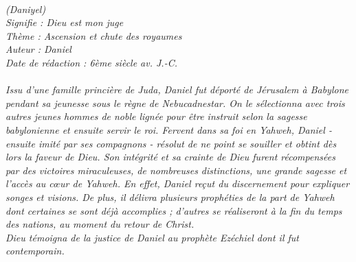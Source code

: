 \BFont
\noindent\hrulefill
{\footnotesize
\textit{
\bigskip
{\centering{}
\\(Daniyel)
\\Signifie : Dieu est mon juge
\\Thème : Ascension et chute des royaumes
\\Auteur : Daniel
\\Date de rédaction : 6ème siècle av. J.-C.\\}
}
\textit{
\\Issu d’une famille princière de Juda, Daniel fut déporté de Jérusalem à Babylone pendant sa jeunesse sous le règne de Nebucadnestar. On le sélectionna avec trois autres jeunes hommes de noble lignée pour être instruit selon la sagesse babylonienne et ensuite servir le roi. Fervent dans sa foi en Yahweh, Daniel - ensuite imité par ses compagnons - résolut de ne point se souiller et obtint dès lors la faveur de Dieu. Son intégrité et sa crainte de Dieu furent récompensées par des victoires miraculeuses, de nombreuses distinctions, une grande sagesse et l’accès au cœur de Yahweh. En effet, Daniel reçut du discernement pour expliquer songes et visions. De plus, il délivra plusieurs prophéties de la part de Yahweh dont certaines se sont déjà accomplies ; d’autres se réaliseront à la fin du temps des nations, au moment du retour de Christ.
\\Dieu témoigna de la justice de Daniel au prophète Ezéchiel dont il fut contemporain.\bigskip
}
}
\par\nobreak\noindent\hrulefill

